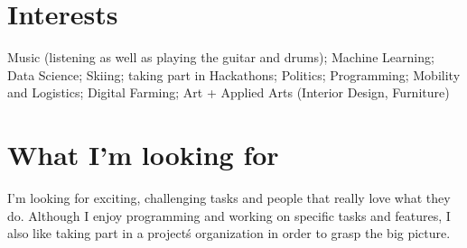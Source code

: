 \documentclass{article}
\begin{document}
\vspace{.9em}
\section{Interests}

Music (listening as well as playing the guitar and drums); Machine Learning; Data Science; Skiing; taking part in Hackathons; Politics; Programming; Mobility and Logistics; Digital Farming; Art + Applied Arts (Interior Design, Furniture)

\vspace{.9em}
\section{What I'm looking for}
I'm looking for exciting, challenging tasks and people that really love what they do. Although I enjoy programming and working on specific tasks and features, I also like taking part in a project\'s organization in order to grasp the big picture. 
\end{document}
